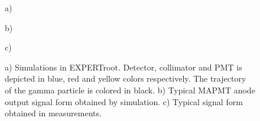 \documentclass{webofc}
\newcommand{\er}{\textmd{EXPERTroot}}
\begin{document}
	\begin{figure} 
		\begin{minipage}[h]{\linewidth} 
			 a) \\ 
		\end{minipage} 
		\vfill 
		\begin{minipage}[h]{0.47\linewidth} 
			 b) \\
		\end{minipage} 
		\hfill 
		\begin{minipage}[h]{0.47\linewidth} 
			 c) \\ 
		\end{minipage} 
		\caption{a) Simulations in \er. \color{red} Detector, collimator and PMT is depicted in blue, red and yellow colors respectively. The trajectory of the gamma particle is colored in black. b) Typical MAPMT anode output signal form obtained by simulation. c) Typical signal form obtained in measurements.} 
		\label{ris:sim} 
	\end{figure}
	
\end{document}
